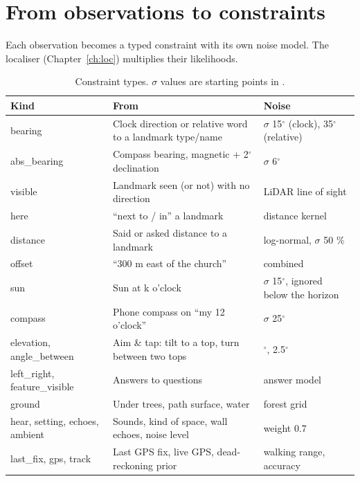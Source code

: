 \section{From observations to constraints}

Each observation becomes a typed constraint with its own noise model. The localiser
(Chapter~\ref{ch:loc}) multiplies their likelihoods.

\begin{table}[htbp]\centering\small
\caption{Constraint types. $\sigma$ values are starting points in .}\label{tab:constraints}
\begin{tabularx}{\linewidth}{>{\ttfamily}lX>{\raggedright\arraybackslash}p{4.2cm}}
\toprule
\normalfont Kind & From & Noise\\
\midrule
bearing & Clock direction or relative word to a landmark type/name & $\sigma$ 15$^\circ$ (clock), 35$^\circ$ (relative)\\
abs\_bearing & Compass bearing, magnetic + 2$^\circ$ declination & $\sigma$ 6$^\circ$\\
visible & Landmark seen (or not) with no direction & LiDAR line of sight\\
here & ``next to / in'' a landmark & distance kernel\\
distance & Said or asked distance to a landmark & log-normal, $\sigma$ 50 \%\\
offset & ``300 m east of the church'' & combined\\
sun & Sun at k o'clock & $\sigma$ 15$^\circ$, ignored below the horizon\\
compass & Phone compass on ``my 12 o'clock'' & $\sigma$ 25$^\circ$\\
elevation, angle\_between & Aim \& tap: tilt to a top, turn between two tops & 2$^\circ$, 2.5$^\circ$\\
left\_right, feature\_visible & Answers to questions & answer model\\
ground & Under trees, path surface, water & forest grid\\
hear, setting, echoes, ambient & Sounds, kind of space, wall echoes, noise level & weight 0.7\\
last\_fix, gps, track & Last GPS fix, live GPS, dead-reckoning prior & walking range, accuracy\\
\bottomrule
\end{tabularx}
\end{table}

